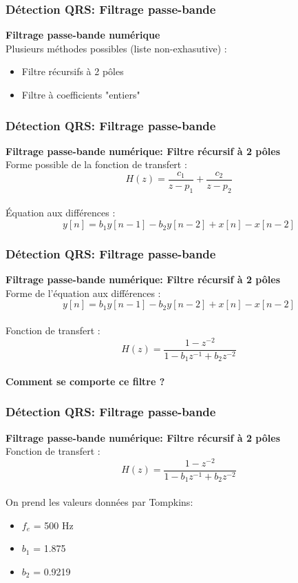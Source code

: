 \documentclass{beamer}
\begin{document}
\begin{frame}
\frametitle{Détection QRS: Filtrage passe-bande}
 \textbf{Filtrage passe-bande numérique}\\
 \vspace{0.3 cm}
 Plusieurs méthodes possibles (liste non-exhasutive) :\\
 \vspace{0.2cm}
 \begin{itemize}
 \item Filtre récursifs à  2 pôles
 \vspace{0.2cm}
 \item Filtre à coefficients "entiers"
 \vspace{0.2cm}
 \end{itemize}
\end{frame}

\begin{frame}
\frametitle{Détection QRS: Filtrage passe-bande}
 \textbf{Filtrage passe-bande numérique: Filtre récursif à  2 pôles}\\
 \vspace{0.3 cm}
 Forme possible de la fonction de transfert :
 \[H(z) = \frac{c_1}{z-p_1} + \frac{c_2}{z-p_2} \]\\
  \vspace{0.3 cm}
  \'Equation aux différences :
 \[y[n] = b_1 y[n-1] - b_2 y[n-2] + x[n] - x[n-2] \]  
\end{frame}

\begin{frame}
\frametitle{Détection QRS: Filtrage passe-bande}
 \textbf{Filtrage passe-bande numérique: Filtre récursif à  2 pôles}\\

  Forme de l'équation aux différences :
 \[y[n] = b_1 y[n-1] - b_2 y[n-2] + x[n] - x[n-2] \]  \\
  \vspace{0.3 cm}
  Fonction de transfert :
   \[H(z) = \frac{1 - z^{-2}}{1 - b_1 z^{-1} + b_2 z^{-2}} \]  \\
  \vspace{0.3cm}
 \textbf{Comment se comporte ce filtre ?}
\end{frame}

\begin{frame}
\frametitle{Détection QRS: Filtrage passe-bande}
 \textbf{Filtrage passe-bande numérique: Filtre récursif à  2 pôles}\\

  \vspace{0.3 cm}
  Fonction de transfert :
   \[H(z) = \frac{1 - z^{-2}}{1 - b_1 z^{-1} + b_2 z^{-2}} \]  \\
  \vspace{0.3cm}
 On prend les valeurs données par Tompkins:
 \begin{itemize}
 \item $f_e$ = 500 Hz
 \item $b_1$ = 1.875
 \item $b_2$ = 0.9219
 \end{itemize}
\end{frame}
\end{document}
